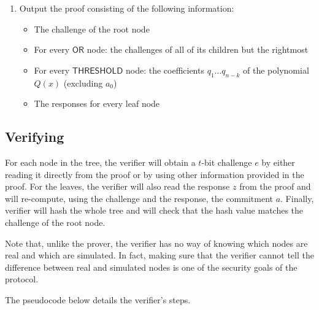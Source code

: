 \documentclass[11pt]{article}
\newcommand{\ornode}{\ensuremath{\mathsf{OR}}}
\newcommand{\tnode}{\ensuremath{\mathsf{THRESHOLD}}}
\begin{document}
\begin{enumerate}
\begin{itemize}
    \end{itemize}

    \item Output the proof consisting of the following information:
    \begin{itemize}
        \item The challenge of the root node
        \item For every $\ornode$ node: the challenges of all of its children but the rightmost
        \item For every $\tnode$ node: the coefficients $q_1 \dots q_{n-k}$ of the polynomial $Q(x)$ (excluding $a_0$)
        \item The responses for every leaf node
    \end{itemize}
\end{enumerate}

\subsection{Verifying}
\label{sec:verifying}


For each node in the tree, the verifier will obtain a $t$-bit challenge $e$ by either reading it directly from the proof or by using other information provided in the proof. For the leaves, the verifier will also read the response $z$ from the proof and will re-compute, using the challenge and the response, the commitment $a$.  Finally, verifier will hash the whole tree and will check that the hash value matches the challenge of the root node.

Note that, unlike the prover, the verifier has no way of knowing which nodes are real and which are simulated. In fact, making sure that the verifier cannot tell the difference between real and simulated nodes is one of the security goals of the protocol.

The pseudocode below details the verifier's steps.
\end{document}
